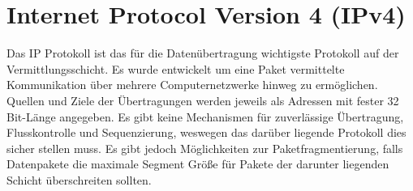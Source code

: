 \section{Internet Protocol Version 4 (IPv4)}
Das IP Protokoll ist das für die Datenübertragung wichtigste Protokoll auf der Vermittlungsschicht. Es wurde entwickelt um eine Paket vermittelte Kommunikation über mehrere Computernetzwerke hinweg zu ermöglichen. Quellen und Ziele der Übertragungen werden jeweils als Adressen mit fester 32 Bit-Länge angegeben. Es gibt keine Mechanismen für zuverlässige Übertragung, Flusskontrolle und Sequenzierung, weswegen das darüber liegende Protokoll dies sicher stellen muss. Es gibt jedoch Möglichkeiten zur Paketfragmentierung, falls Datenpakete die maximale Segment Größe für Pakete der darunter liegenden Schicht überschreiten sollten.


